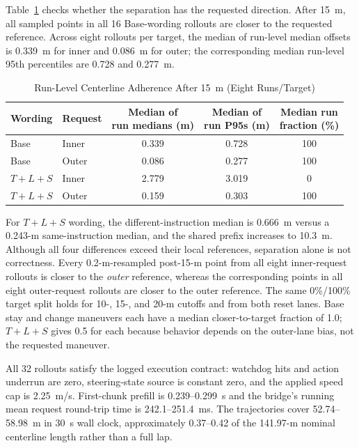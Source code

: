 \documentclass[letterpaper,conference]{IEEEtran}
\begin{document}
Table~\ref{tab:adherence} checks whether the separation has the requested
direction. After 15~m, all sampled points in all 16 Base-wording rollouts
are closer to the requested reference. Across eight rollouts per target, the
median of run-level median offsets is 0.339~m for inner and 0.086~m for outer;
the corresponding median run-level 95th percentiles are 0.728 and 0.277~m.

\begin{table}[!ht]
\caption{Run-Level Centerline Adherence After 15~m (Eight Runs/Target)}
\label{tab:adherence}
\centering
\footnotesize
\setlength{\tabcolsep}{3.1pt}
\begin{tabular}{@{}llccc@{}}
\toprule
Wording & Request & \shortstack{Median of\\run medians (m)} & \shortstack{Median of\\run P95s (m)} & \shortstack{Median run\\fraction (\%)} \\
\midrule
Base & Inner & 0.339 & 0.728 & 100 \\
Base & Outer & 0.086 & 0.277 & 100 \\
$T{+}L{+}S$ & Inner & 2.779 & 3.019 & 0 \\
$T{+}L{+}S$ & Outer & 0.159 & 0.303 & 100 \\
\bottomrule
\end{tabular}
\end{table}

For $T{+}L{+}S$ wording, the different-instruction median is 0.666~m versus a
0.243-m same-instruction median, and the shared prefix increases to 10.3~m.
Although all four differences exceed their local references, separation alone is
not correctness. Every 0.2-m-resampled post-15-m point from all eight
inner-request rollouts is closer to the \emph{outer} reference, whereas the
corresponding points in all eight outer-request rollouts are closer to the outer
reference. The same 0\%/100\% target split holds for 10-, 15-,
and 20-m cutoffs and from both reset lanes. Base stay and change maneuvers
each have a median closer-to-target fraction of 1.0; $T{+}L{+}S$ gives 0.5
for each because behavior depends on the outer-lane bias, not the requested
maneuver.

All 32 rollouts satisfy the logged execution contract: watchdog hits and action
underrun are zero, steering-state source is constant zero, and the applied speed
cap is 2.25~m/s. First-chunk prefill is 0.239--0.299~s and the bridge's running
mean request round-trip time is 242.1--251.4~ms. The trajectories cover 52.74--58.98~m in
30~s wall clock, approximately 0.37--0.42 of the 141.97-m nominal centerline
length rather than a full lap.
\end{document}
